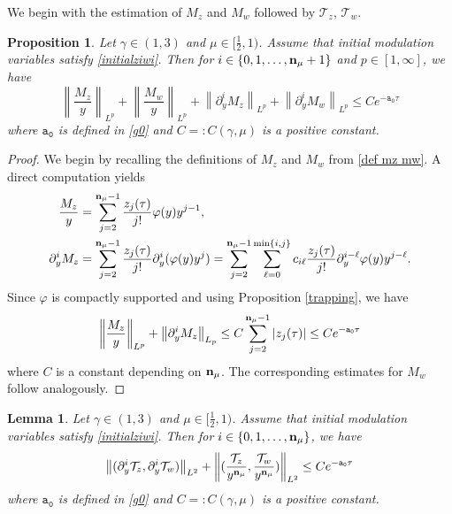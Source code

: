 \documentclass{article}
\newcommand{\norm}[1]{\left\lVert#1\right\rVert}
\newcommand{\ga}{\gamma}
\newcommand{\pa}{\partial}
\def\be{\begin{equation}}
\def\ee{\end{equation}}
\def\mz{M_z}
\def\mw{M_w}
\def\nmz{\mathcal T_z}
\def\nmw{\mathcal T_w}
\def\epzero{\mathtt{a_0}}
\def\ndmu{{\bf{n}_{\mu}}}
\numberwithin{equation}{section}
\newtheorem{lemma}[theorem]{Lemma}
\newtheorem{proposition}[theorem]{Proposition}
\begin{document}
We begin with the estimation of $\mz$ and $\mw$ followed by $\nmz$, $\nmw$. 

\begin{proposition}\label{prop payi mz mw}
	Let $\ga\in(1,3)$ and $\mu\in[\frac12, 1)$. 
    Assume that initial modulation variables satisfy \eqref{initialziwi}. Then for $i\in\{0,1,\dots,\ndmu+1\}$ and $p\in[1,\infty]$, we have 
	\be
		\norm{\frac{\mz}{y}}_{L^p}+\norm{\frac{\mw}{y}}_{L^p}+\norm{ \pa_y^i \mz}_{L^p}+\norm{\pa_y^i \mw }_{L^p} \leq Ce^{-\epzero \tau} 
	\ee
	where $\epzero$ is defined in \eqref{g0} and $C=:C(\ga,\mu)$ is a positive constant. 
\end{proposition}
\begin{proof}
    We begin by recalling the definitions of $\mz$ and $\mw$ from \eqref{def mz mw}. A direct computation yields
    \begin{align*}
        \frac{\mz}{y} &= \sum_{j=2}^{\ndmu-1}  \frac{z_j(\tau)}{j!}\varphi(y)y^{j-1},\\
        \pa_y^i\mz &= \sum_{j=2}^{\ndmu-1}  \frac{z_j(\tau)}{j!}\pa_y^i(\varphi(y)y^j) = \sum_{j=2}^{\ndmu-1}  \sum_{\ell=0}^{\min \{i,j\}} c_{i\ell }\frac{z_j(\tau)}{j!}\pa_y^{i-\ell}\varphi(y)y^{j-\ell}.
    \end{align*}
    Since $\varphi$ is compactly supported and using Proposition \ref{trapping}, we have
    \[
       \norm{\frac{\mz}{y}}_{L^p}+ \norm{\pa_y^i\mz}_{L_p} \leq C \sum_{j=2}^{\ndmu-1}  | z_j(\tau) | \leq C e^{-\epzero \tau} 
    \]
    where $C$ is a constant depending on $\ndmu$. The corresponding estimates for $\mw$ follow analogously.
 \end{proof}
\begin{lemma}\label{prop Tz Tw /y}
Let $\ga\in(1,3)$ and $\mu\in[\frac12, 1)$. 
Assume that initial modulation variables satisfy \eqref{initialziwi}. Then for $i\in\{0,1,\dots,\ndmu\}$, we have 
    \be
        \norm{ (\pa_y^i\nmz,\pa_y^i\nmw)}_{L^2} +\norm{( \frac{\nmz}{y^{\ndmu}}, \frac{\nmw}{y^{\ndmu}} )}_{L^2}\le C e^{-\epzero \tau}
    \ee
    where $\epzero$ is defined in \eqref{g0} and $C=:C(\ga,\mu)$ is a positive constant.
\end{lemma}
\end{document}
